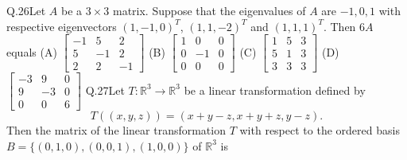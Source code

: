 \documentclass{article}
\begin{document}
																															    \newpage
																															    Q.26\quad Let $A$ be a $3 \times 3$ matrix. Suppose that the eigenvalues of $A$ are $-1, 0, 1$ with respective eigenvectors $(1, -1, 0)^T$, $(1, 1, -2)^T$ and $(1, 1, 1)^T$. Then $6A$ equals
																															    \newline
																															    \noindent (A) $\begin{bmatrix} -1 & 5 & 2 \\ 5 & -1 & 2 \\ 2 & 2 & -1 \end{bmatrix}$\hspace{6cm} (B) $\begin{bmatrix} 1 & 0 & 0 \\ 0 & -1 & 0 \\ 0 & 0 & 0 \end{bmatrix}$
																															    \newline \noindent (C) $\begin{bmatrix} 1 & 5 & 3 \\ 5 & 1 & 3 \\ 3 & 3 & 3 \end{bmatrix}$\hspace{6.75cm}  (D) $\begin{bmatrix} -3 & 9 & 0 \\ 9 & -3 & 0 \\ 0 & 0 & 6 \end{bmatrix}$
																															    \vspace{1em}
																															    \newline
																															    Q.27\quad Let $T:\mathbb{R}^3 \rightarrow \mathbb{R}^3$ be a linear transformation defined by
																															    \[
																															    T((x, y, z)) = (x + y - z, x + y + z, y - z).
																															    \]
																															    Then the matrix of the linear transformation $T$ with respect to the ordered basis $B = \{(0,1,0), (0,0,1), (1,0,0)\}$ of $\mathbb{R}^3$ is
																															    \vspace{1em}
\end{document}
